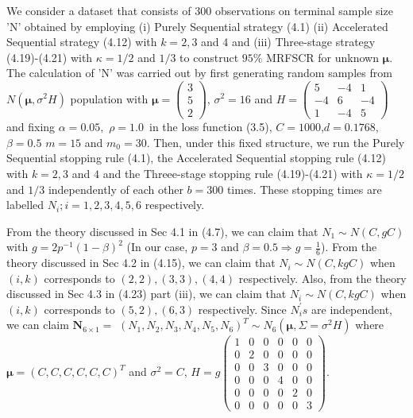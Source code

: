 \documentclass{article}
\begin{document}
\noindent We consider a dataset that consists of $300$ observations on
terminal sample size 'N' obtained by employing (i) Purely Sequential
strategy (4.1) (ii) Accelerated Sequential strategy (4.12) with $k=2,3$ and $%
4$ and (iii) Three-stage strategy (4.19)-(4.21) with $\kappa =1/2$ and $1/3$
to construct $95\%$ MRFSCR for unknown $\mathbf{\mu }$. The calculation of
'N' was carried out by first generating random samples from $N(\mathbf{\mu }%
,\sigma ^{2}H)$ population with $\mathbf{\mu =}\left( 
\begin{array}{c}
3 \\ 
5 \\ 
2%
\end{array}%
\right) $, $\sigma ^{2}=16$ and $H=\left( 
\begin{array}{ccc}
5 & -4 & 1 \\ 
-4 & 6 & -4 \\ 
1 & -4 & 5%
\end{array}%
\right) $ and fixing $\alpha =0.05,$ $\rho =1.0$\ in the loss function (3.5),%
$C=1000$,$d=0.1768$,$\beta =0.5$ $m=15$ and $m_{0}=30$. Then, under this
fixed structure, we run the Purely Sequential stopping rule (4.1), the
Accelerated Sequential stopping rule (4.12) with $k=2,3$ and $4$ and the
Threee-stage stopping rule (4.19)-(4.21) with $\kappa =1/2$ and $1/3$
independently of each other $b=300$ times. These stopping times are labelled $N_{i};i=1,2,3,4,5,6$ respectively.

From the theory discussed in Sec 4.1 in (4.7), we can claim that $N_{1}\sim
N(C,gC)$ with $g=2p^{-1}(1-\beta )^{2}$ (In our case, $p=3$ and $\beta
=0.5\Rightarrow g=\frac{1}{6}$). From the theory discussed in Sec 4.2 in
(4.15), we can claim that $N_{i}\sim N(C,kgC)$ when $(i,k)$ corresponds to $%
(2,2),(3,3),(4,4)$ respectively. Also, from the theory discussed in Sec 4.3
in (4.23) part (iii), we can claim that $N_{i}\sim N(C,kgC)$ when $(i,k)$
corresponds to $(5,2),(6,3)$ respectively. Since $N_{i}^{\prime }s$ are
independent, we can claim $\mathbf{N}_{6\times 1}=$ $\left(
N_{1},N_{2},N_{3},N_{4},N_{5},N_{6}\right) ^{T}\sim N_{6}(\mathbf{\mu }%
,\Sigma =\sigma ^{2}H)$ where $\mathbf{\mu }=(C,C,C,C,C,C)^{T}$ and $\sigma
^{2}=C$, $H=g%
\begin{pmatrix}
1 & 0 & 0 & 0 & 0 & 0 \\ 
0 & 2 & 0 & 0 & 0 & 0 \\ 
0 & 0 & 3 & 0 & 0 & 0 \\ 
0 & 0 & 0 & 4 & 0 & 0 \\ 
0 & 0 & 0 & 0 & 2 & 0 \\ 
0 & 0 & 0 & 0 & 0 & 3%
\end{pmatrix}%
$.\\
\end{document}
